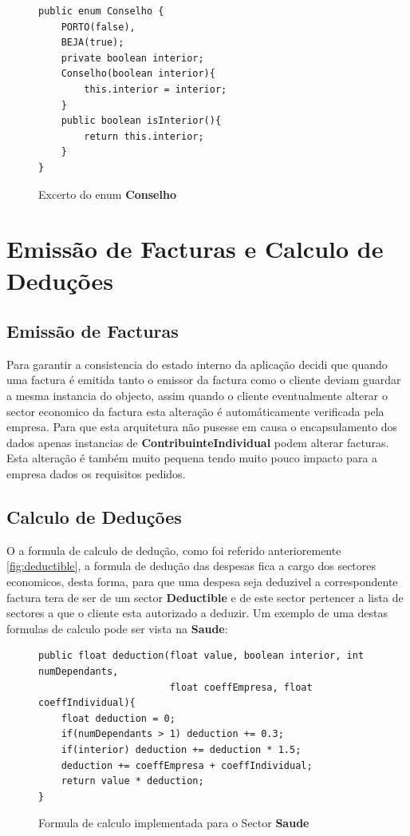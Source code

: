 \documentclass[12pt,a4paper]{report}
\begin{document}
    \begin{figure}[h]
        \begin{verbatim}
public enum Conselho {
    PORTO(false),
    BEJA(true);
    private boolean interior;
    Conselho(boolean interior){
        this.interior = interior;
    }
    public boolean isInterior(){
        return this.interior;
    }
}
        \end{verbatim}
        \caption{Excerto do enum \textbf{Conselho}}
        \label{fig:conselhos}
    \end{figure}

\chapter{Emissão de Facturas e Calculo de Deduções}

\section{Emissão de Facturas}
\label{sec:emissao}
    Para garantir a consistencia do estado interno da aplicação decidi que
    quando uma factura é emitida tanto o emissor da factura como o cliente
    deviam guardar a mesma instancia do objecto, assim quando o cliente
    eventualmente alterar o sector economico da factura esta alteração é
    automáticamente verificada pela empresa. Para que esta arquitetura não
    pusesse em causa o encapsulamento dos dados apenas instancias de
    \textbf{ContribuinteIndividual} podem alterar facturas. Esta alteração
    é também muito pequena tendo muito pouco impacto para a empresa dados
    os requisitos pedidos.

\section{Calculo de Deduções}
    O a formula de calculo de dedução, como foi referido anterioremente
    \ref{fig:deductible}, a formula de dedução das despesas fica a cargo dos
    sectores economicos, desta forma, para que uma despesa seja deduzivel
    a correspondente factura tera de ser de um sector \textbf{Deductible}
    e de este sector pertencer a lista de sectores a que o cliente esta
    autorizado a deduzir. Um exemplo de uma destas formulas de calculo pode
    ser vista na \textbf{Saude}:
    \begin{figure}[h]
        \begin{verbatim}
public float deduction(float value, boolean interior, int numDependants,
                       float coeffEmpresa, float coeffIndividual){
    float deduction = 0;
    if(numDependants > 1) deduction += 0.3;
    if(interior) deduction += deduction * 1.5;
    deduction += coeffEmpresa + coeffIndividual;
    return value * deduction;
}
        \end{verbatim}
        \caption{Formula de calculo implementada para o Sector \textbf{Saude}}
        \label{fig:formulaDeduct}
    \end{figure}
\end{document}
